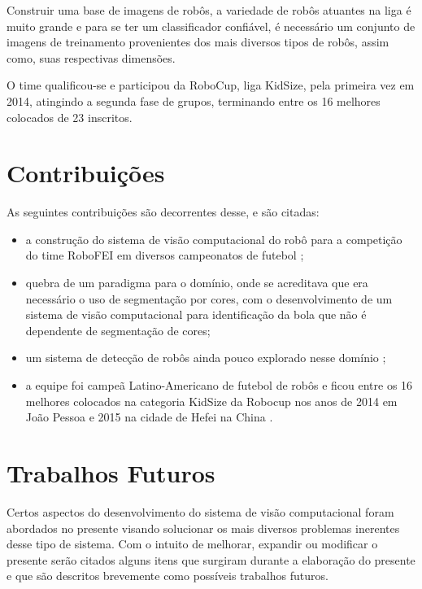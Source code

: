 Construir uma base de imagens de robôs, a variedade de robôs atuantes na liga é muito grande e para se ter um classificador confiável, é necessário um conjunto de imagens de treinamento provenientes dos mais diversos tipos de robôs, assim como, suas respectivas dimensões.

O time qualificou-se e participou da RoboCup, liga KidSize, pela primeira vez em 2014, atingindo a segunda fase de grupos, terminando entre os 16 melhores colocados de 23 inscritos. 



\section{Contribuições}

As seguintes contribuições são decorrentes desse, e são citadas:

\begin{itemize}
	\item a construção do sistema de visão computacional do robô para a competição do time RoboFEI em diversos campeonatos de futebol \cite{Vilao} \cite{perico2014hardware};
	\item quebra de um paradigma para o domínio, onde se acreditava que era necessário o uso de segmentação por cores, com o desenvolvimento de um sistema de visão computacional para identificação da bola que não é dependente de segmentação de cores;
	\item um sistema de detecção de robôs ainda pouco explorado nesse domínio \cite{Vilao2};
	\item a equipe foi campeã Latino-Americano de futebol de robôs \cite{LARC2014} e ficou entre os 16 melhores colocados na categoria KidSize da Robocup nos anos de 2014 em João Pessoa \cite{JP2014} e 2015 na cidade de Hefei na China \cite{JP2015}.
\end{itemize}


\section{Trabalhos Futuros}

Certos aspectos do desenvolvimento do sistema de visão computacional foram abordados no presente visando solucionar os mais diversos problemas inerentes desse tipo de sistema. Com o intuito de melhorar, expandir ou modificar o presente serão citados alguns itens que surgiram durante a elaboração do presente e que são descritos brevemente como possíveis trabalhos futuros.


